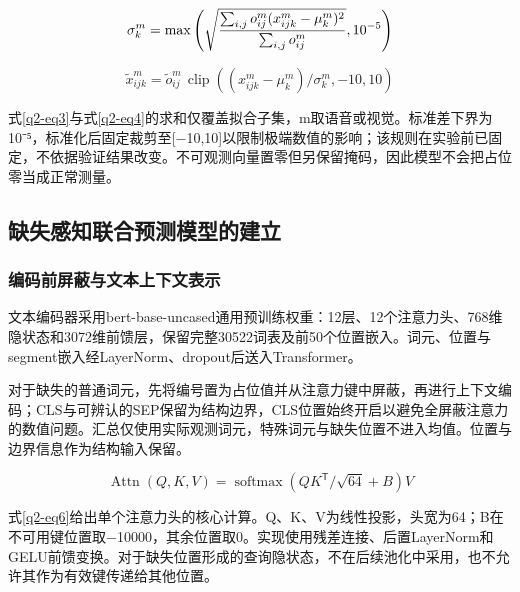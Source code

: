 \begin{equation}
\sigma_k^m=\max\left(\sqrt{{\sum_{i,j}o_{ij}^m(x_{ijk}^m-\mu_k^m)^2\over\sum_{i,j}o_{ij}^m}},10^{-5}\right)\label{q2-eq4}
\end{equation}

\begin{equation}
\widetilde{x}_{ijk}^{m}=\widetilde{o}_{ij}^{m}\,\operatorname{clip}((x_{ijk}^{m}-\mu_k^m)/\sigma_k^m,-10,10)\label{q2-eq5}
\end{equation}

式\eqref{q2-eq3}与式\eqref{q2-eq4}的求和仅覆盖拟合子集，m取语音或视觉。标准差下界为10⁻⁵，标准化后固定裁剪至{[}−10,10{]}以限制极端数值的影响；该规则在实验前已固定，不依据验证结果改变。不可观测向量置零但另保留掩码，因此模型不会把占位零当成正常测量。

\hypertarget{q2-ux7f3aux5931ux611fux77e5ux8054ux5408ux9884ux6d4bux6a21ux578bux7684ux5efaux7acb}{%
\subsection{缺失感知联合预测模型的建立}\label{q2-ux7f3aux5931ux611fux77e5ux8054ux5408ux9884ux6d4bux6a21ux578bux7684ux5efaux7acb}}

\hypertarget{q2-ux7f16ux7801ux524dux5c4fux853dux4e0eux6587ux672cux4e0aux4e0bux6587ux8868ux793a}{%
\subsubsection{编码前屏蔽与文本上下文表示}\label{q2-ux7f16ux7801ux524dux5c4fux853dux4e0eux6587ux672cux4e0aux4e0bux6587ux8868ux793a}}

文本编码器采用bert-base-uncased通用预训练权重\cite{q2-ref1,q2-ref2}：12层、12个注意力头、768维隐状态和3072维前馈层，保留完整30522词表及前50个位置嵌入。词元、位置与segment嵌入经LayerNorm、dropout后送入Transformer。

对于缺失的普通词元，先将编号置为占位值并从注意力键中屏蔽，再进行上下文编码；CLS与可辨认的SEP保留为结构边界，CLS位置始终开启以避免全屏蔽注意力的数值问题。汇总仅使用实际观测词元，特殊词元与缺失位置不进入均值。位置与边界信息作为结构输入保留。

\begin{equation}
\operatorname{Attn}(Q,K,V)=\operatorname{softmax}(QK^{\mathsf T}/\sqrt{64}+B)V\label{q2-eq6}
\end{equation}

式\eqref{q2-eq6}给出单个注意力头的核心计算。Q、K、V为线性投影，头宽为64；B在不可用键位置取−10000，其余位置取0。实现使用残差连接、后置LayerNorm和GELU前馈变换。对于缺失位置形成的查询隐状态，不在后续池化中采用，也不允许其作为有效键传递给其他位置。

